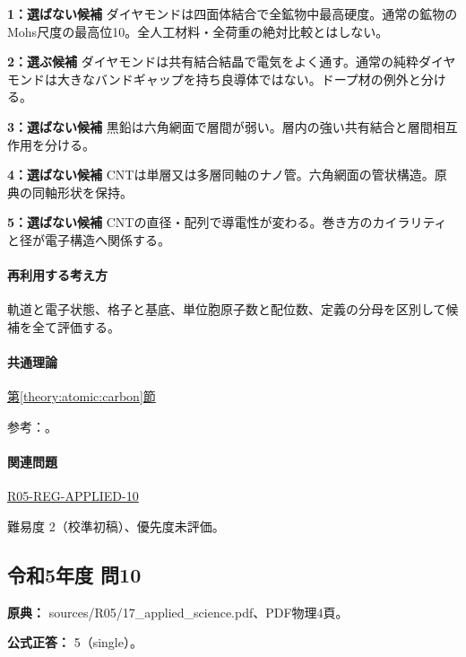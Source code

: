 \noindent\textbf{1：選ばない候補} ダイヤモンドは四面体結合で全鉱物中最高硬度。通常の鉱物のMohs尺度の最高位10。全人工材料・全荷重の絶対比較とはしない。\par

\noindent\textbf{2：選ぶ候補} ダイヤモンドは共有結合結晶で電気をよく通す。通常の純粋ダイヤモンドは大きなバンドギャップを持ち良導体ではない。ドープ材の例外と分ける。\par

\noindent\textbf{3：選ばない候補} 黒鉛は六角網面で層間が弱い。層内の強い共有結合と層間相互作用を分ける。\par

\noindent\textbf{4：選ばない候補} CNTは単層又は多層同軸のナノ管。六角網面の管状構造。原典の同軸形状を保持。\par

\noindent\textbf{5：選ばない候補} CNTの直径・配列で導電性が変わる。巻き方のカイラリティと径が電子構造へ関係する。\par

\paragraph{再利用する考え方} 軌道と電子状態、格子と基底、単位胞原子数と配位数、定義の分母を区別して候補を全て評価する。

\paragraph{共通理論} \hyperref[theory:atomic:carbon]{第\ref*{theory:atomic:carbon}節}

\par 参考：\cite{atomic_cnt,atomic_diamond}。

\paragraph{関連問題} \hyperref[q:r05-reg-applied-10]{R05-REG-APPLIED-10}

\par 難易度 2（校準初稿）、優先度未評価。

\subsection{令和5年度 問10}
\label{q:r05-reg-applied-10}

\noindent\textbf{原典：} sources/R05/17\_applied\_science.pdf、PDF物理4頁。

\textbf{公式正答：} 5（single）。

